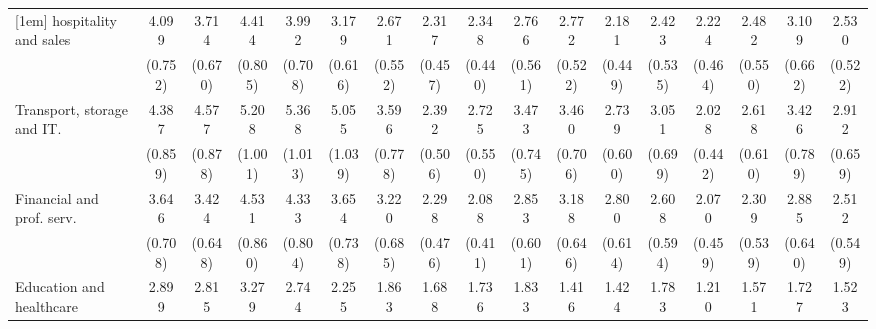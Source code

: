 {\begin{tabular}{l*{16}{c}}
[1em]
hospitality and sales&       4.099\sym{***}&       3.714\sym{***}&       4.414\sym{***}&       3.992\sym{***}&       3.179\sym{***}&       2.671\sym{***}&       2.317\sym{***}&       2.348\sym{***}&       2.766\sym{***}&       2.772\sym{***}&       2.181\sym{***}&       2.423\sym{***}&       2.224\sym{***}&       2.482\sym{***}&       3.109\sym{***}&       2.530\sym{***}\\
                    &     (0.752)         &     (0.670)         &     (0.805)         &     (0.708)         &     (0.616)         &     (0.552)         &     (0.457)         &     (0.440)         &     (0.561)         &     (0.522)         &     (0.449)         &     (0.535)         &     (0.464)         &     (0.550)         &     (0.662)         &     (0.522)         \\
[1em]
Transport, storage and IT.&       4.387\sym{***}&       4.577\sym{***}&       5.208\sym{***}&       5.368\sym{***}&       5.055\sym{***}&       3.596\sym{***}&       2.392\sym{***}&       2.725\sym{***}&       3.473\sym{***}&       3.460\sym{***}&       2.739\sym{***}&       3.051\sym{***}&       2.028\sym{**} &       2.618\sym{***}&       3.426\sym{***}&       2.912\sym{***}\\
                    &     (0.859)         &     (0.878)         &     (1.001)         &     (1.013)         &     (1.039)         &     (0.778)         &     (0.506)         &     (0.550)         &     (0.745)         &     (0.706)         &     (0.600)         &     (0.699)         &     (0.442)         &     (0.610)         &     (0.789)         &     (0.659)         \\
[1em]
Financial and prof. serv.&       3.646\sym{***}&       3.424\sym{***}&       4.531\sym{***}&       4.333\sym{***}&       3.654\sym{***}&       3.220\sym{***}&       2.298\sym{***}&       2.088\sym{***}&       2.853\sym{***}&       3.188\sym{***}&       2.800\sym{***}&       2.608\sym{***}&       2.070\sym{**} &       2.309\sym{***}&       2.885\sym{***}&       2.512\sym{***}\\
                    &     (0.708)         &     (0.648)         &     (0.860)         &     (0.804)         &     (0.738)         &     (0.685)         &     (0.476)         &     (0.411)         &     (0.601)         &     (0.646)         &     (0.614)         &     (0.594)         &     (0.459)         &     (0.539)         &     (0.640)         &     (0.549)         \\
[1em]
Education and healthcare&       2.899\sym{***}&       2.815\sym{***}&       3.279\sym{***}&       2.744\sym{***}&       2.255\sym{***}&       1.863\sym{**} &       1.688\sym{*}  &       1.736\sym{*}  &       1.833\sym{**} &       1.416         &       1.424         &       1.783\sym{*}  &       1.210         &       1.571         &       1.727\sym{*}  &       1.523         \\

\end{tabular}}

